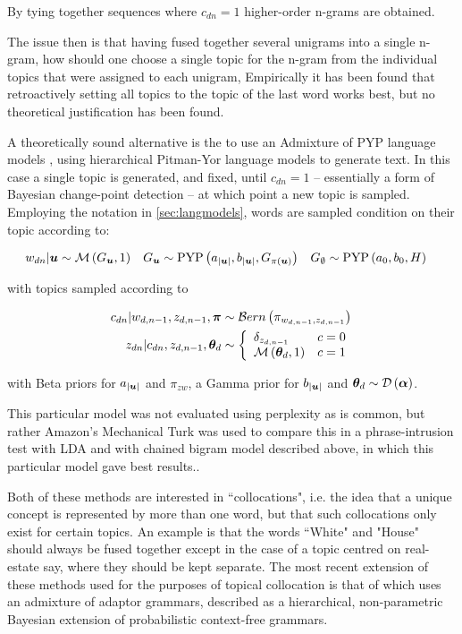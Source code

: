 By tying together sequences where $c_{dn}=1$ higher-order n-grams are obtained.

The issue then is that having fused together several unigrams into a single n-gram, how should one choose a single topic for the n-gram from the individual topics that were assigned to each unigram, Empirically it has been found that retroactively setting all topics to the topic of the last word works best, but no theoretical justification has been found.

A theoretically sound alternative is the to use an Admixture of PYP language models \cite{Lindsey2012}, using hierarchical Pitman-Yor language models to generate text. In this case a single topic is generated, and fixed, until $c_{dn}=1$ -- essentially a form of Bayesian change-point detection -- at which point a new topic is sampled. Employing the notation in \ref{sec:langmodels}, words are sampled condition on their topic according to:

\begin{align}
w_{dn} | \bm u &\sim \mathcal{M} \left( {G_{\bm u}},{1} \right) &
G_{\bm u} &\sim \text{PYP}\left( a_{|\bm u|}, b_{|\bm u|}, G_{\pi(\bm u)} \right) &
G_{\emptyset} &\sim \text{PYP}\left( a_{0}, b_{0}, H \right)
\end{align}

with topics sampled according to

\begin{align}
c_{dn} | w_{d,n-1}, z_{d,n-1}, \bm \pi &\sim \mathcal{B}ern \left(\pi_{ w_{d,n-1}, z_{d,n-1}}\right) \\
z_{dn} | c_{dn}, z_{d,n-1}, { \bm \theta_d } & \sim \left\{ \begin{array}{lr}
     \delta_{z_{d,n - 1}} & c = 0 \\
     \mathcal{M} \left( {{ \bm \theta_d }},{1} \right) & c = 1
 \end{array}\right.
\end{align}

with Beta priors for $a_{|\bm u|}$ and $\pi_{zw}$, a Gamma prior for  $b_{|\bm u|}$ and ${ \bm \theta_d } \sim \mathcal{D} \left( {\bm \alpha} \right)$.

This particular model was not evaluated using perplexity as is common, but rather Amazon's Mechanical Turk was used to compare this in a phrase-intrusion test with LDA and with chained bigram model described above, in which this particular model gave best results..

Both of these methods are interested in ``collocations", i.e. the idea that a unique concept is represented by more than one word, but that such collocations only exist for certain topics. An example is that the words ``White" and "House" should always be fused together except in the case of a topic centred on real-estate say, where they should be kept separate. The most recent extension of these methods used for the purposes of topical collocation is that of \cite{Johnson2010} which uses an admixture of adaptor grammars, described as a hierarchical, non-parametric Bayesian extension of probabilistic context-free grammars. 

